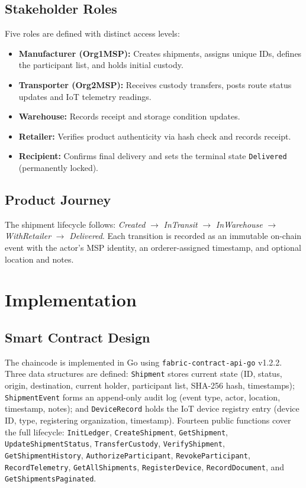 \documentclass[conference]{IEEEtran}
\begin{document}
\subsection{Stakeholder Roles}

Five roles are defined with distinct access levels:

\begin{itemize}
  \item \textbf{Manufacturer (Org1MSP):} Creates shipments, assigns unique
    IDs, defines the participant list, and holds initial custody.
  \item \textbf{Transporter (Org2MSP):} Receives custody transfers, posts
    route status updates and IoT telemetry readings.
  \item \textbf{Warehouse:} Records receipt and storage condition updates.
  \item \textbf{Retailer:} Verifies product authenticity via hash check and
    records receipt.
  \item \textbf{Recipient:} Confirms final delivery and sets the terminal
    state \texttt{Delivered} (permanently locked).
\end{itemize}

\subsection{Product Journey}

The shipment lifecycle follows:
\textit{Created} $\rightarrow$ \textit{InTransit} $\rightarrow$
\textit{InWarehouse} $\rightarrow$ \textit{WithRetailer} $\rightarrow$
\textit{Delivered}.
Each transition is recorded as an immutable on-chain event with the actor's
MSP identity, an orderer-assigned timestamp, and optional location and notes.

\section{Implementation}

\subsection{Smart Contract Design}

The chaincode is implemented in Go using
\texttt{fabric-contract-api-go} v1.2.2.  Three data structures are defined:
\texttt{Shipment} stores current state (ID, status, origin, destination,
current holder, participant list, SHA-256 hash, timestamps);
\texttt{ShipmentEvent} forms an append-only audit log (event type, actor,
location, timestamp, notes); and \texttt{DeviceRecord} holds the IoT device
registry entry (device ID, type, registering organization, timestamp).
Fourteen public functions cover the full lifecycle:
\texttt{InitLedger}, \texttt{CreateShipment},
\texttt{GetShipment}, \texttt{UpdateShipmentStatus},
\texttt{TransferCustody}, \texttt{VerifyShipment},
\texttt{GetShipmentHistory}, \texttt{AuthorizeParticipant},
\texttt{RevokeParticipant}, \texttt{RecordTelemetry},
\texttt{GetAllShipments}, \texttt{RegisterDevice},
\texttt{RecordDocument}, and \texttt{GetShipmentsPaginated}.
\end{document}
